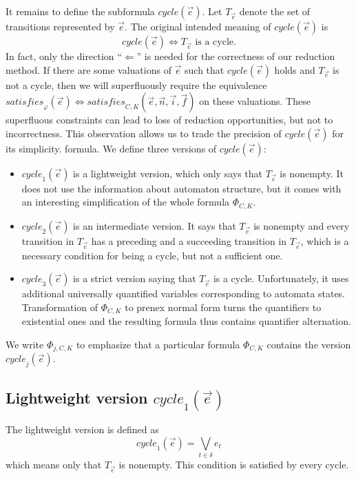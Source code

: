 \documentclass[a4paper,UKenglish,cleveref,autoref,thm-restate]{lipics-v2021}
\newcommand{\rem}{\mathit{nm}}
\newcommand{\mcycle}{\mathit{cycle}}
\newcommand{\msat}{\mathit{satisfies}}
\newcommand{\Te}{T_{\vec{e}}}
\begin{document}
It remains to define the subformula $\mcycle(\vec{e})$. Let $\Te$
denote the set of transitions represented by $\vec{e}$. The original
intended meaning of $\mcycle(\vec{e})$ is
\[
  \mcycle(\vec{e}) \iff \Te\textrm{ is a cycle}.
\]
In fact, only the direction ``$\Longleftarrow$'' is needed for the
correctness of our reduction method. If there are some valuations of
$\vec{e}$ such that $\mcycle(\vec{e})$ holds and $\Te$ is not a cycle,
then we will superfluously require the equivalence
$\msat_\varphi(\vec{e}) \iff
\msat_{C,K}(\vec{e},\vec{n},\vec{i},\vec{f})$ on these valuations.
These superfluous constraints can lead to loss of reduction
opportunities, but not to incorrectness. This observation allows us to
trade the precision of $\mcycle(\vec{e})$ for its simplicity.
formula.
%
We define three versions of $\mcycle(\vec{e})$:
\begin{itemize}
\item $\mcycle_1(\vec{e})$ is a lightweight version, which only says
  that $\Te$ is nonempty. It does not use the information about
  automaton structure, but it comes with an interesting simplification
  of the whole formula $\Phi_{C,K}$.
\item $\mcycle_2(\vec{e})$ is an intermediate version. It says that $\Te$
  is nonempty and every transition in $\Te$ has %
  a preceding
  and a succeeding transition in $\Te$, which is a necessary condition
  for being a cycle, but not a sufficient one.
\item $\mcycle_3(\vec{e})$ is a strict version saying that $\Te$ is a
  cycle. Unfortunately, it uses additional universally quantified
  variables corresponding to automata states. Transformation of
  $\Phi_{C,K}$ to prenex normal form turns the quantifiers to
  existential ones and the resulting formula thus contains quantifier
  alternation.
\end{itemize}
We write $\Phi_{j,C,K}$ %
to emphasize that a particular
formula $\Phi_{C,K}$ contains the version $\mcycle_j(\vec{e})$.

\subsection{Lightweight version $\mcycle_1(\vec{e})$}
The lightweight version is defined as
\[
  \mcycle_1(\vec{e})=\bigvee_{t\in\delta}e_t
\]
which means only that $\Te$ is nonempty. This condition is satisfied by
every cycle.
\end{document}
